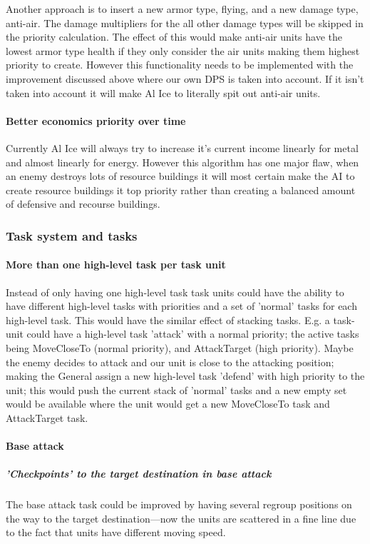 Another approach is to insert a new armor type, flying, and a new damage type, anti-air. The damage
multipliers for the all other damage types will be skipped in the priority calculation. The
effect of this would make anti-air units have the lowest armor type health if they only consider the
air units making them highest priority to create. However this functionality needs to be implemented
with the improvement discussed above where our own DPS is taken into account. If it isn't taken into
account it will make Al Ice to literally spit out anti-air units.

\paragraph{Better economics priority over time}
\label{sec:priority_improvement_better_economics_priority}
Currently Al Ice will always try to increase it's current income linearly for metal and almost
linearly for energy. However this algorithm has one major flaw, when an enemy destroys lots of
resource buildings it will most certain make the AI to create resource buildings it top
priority rather than creating a balanced amount of defensive and recourse buildings.

\subsubsection{Task system and tasks}
\paragraph{More than one high-level task per task unit}
Instead of only having one high-level task task units could have the ability to have different
high-level tasks with priorities and a set of 'normal' tasks for each high-level task. This would
have the similar effect of stacking tasks. E.g. a task-unit could have a high-level task 'attack'
with a normal priority; the active tasks being MoveCloseTo (normal priority), and AttackTarget
(high priority). Maybe the enemy decides to attack and our unit is close to the attacking position;
making the General assign a new high-level task 'defend' with high priority to the unit; this would
push the current stack of 'normal' tasks and a new empty set would be available where the unit would
get a new MoveCloseTo task and AttackTarget task.

\paragraph{Base attack}
\subparagraph{'Checkpoints' to the target destination in base attack}
The base attack task could be improved by having several regroup positions
on the way to the target destination---now the units are scattered in a fine line due to the fact that units have different
moving speed.

